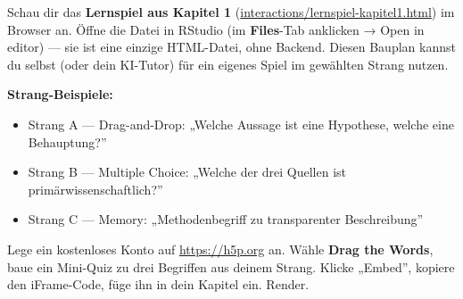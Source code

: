 \documentclass[
  ngerman,
  a4paper,
  DIV=11]{scrreprt}
\providecommand{\tightlist}{%
  \setlength{\itemsep}{0pt}\setlength{\parskip}{0pt}}
\begin{document}
\begin{tcolorbox}[enhanced jigsaw, opacitybacktitle=0.6, leftrule=.75mm, title=\textcolor{quarto-callout-tip-color}{\faLightbulb}\hspace{0.5em}{Mach mit (Variante A --- statisches HTML)}, colframe=quarto-callout-tip-color-frame, arc=.35mm, toprule=.15mm, colbacktitle=quarto-callout-tip-color!10!white, bottomrule=.15mm, colback=white, rightrule=.15mm, breakable, toptitle=1mm, bottomtitle=1mm, opacityback=0, titlerule=0mm, coltitle=black, left=2mm]

Schau dir das \textbf{Lernspiel aus Kapitel 1}
(\href{../interactions/lernspiel-kapitel1.html}{interactions/lernspiel-kapitel1.html})
im Browser an. Öffne die Datei in RStudio (im \textbf{Files}-Tab
anklicken → Open in editor) --- sie ist eine einzige HTML-Datei, ohne
Backend. Diesen Bauplan kannst du selbst (oder dein KI-Tutor) für ein
eigenes Spiel im gewählten Strang nutzen.

\textbf{Strang-Beispiele:}

\begin{itemize}
\tightlist
\item
  Strang A --- Drag-and-Drop: „Welche Aussage ist eine Hypothese, welche
  eine Behauptung?''
\item
  Strang B --- Multiple Choice: „Welche der drei Quellen ist
  primärwissenschaftlich?''
\item
  Strang C --- Memory: „Methodenbegriff zu transparenter Beschreibung''
\end{itemize}

\end{tcolorbox}

\begin{tcolorbox}[enhanced jigsaw, opacitybacktitle=0.6, leftrule=.75mm, title=\textcolor{quarto-callout-tip-color}{\faLightbulb}\hspace{0.5em}{Mach mit (Variante B --- H5P, optional)}, colframe=quarto-callout-tip-color-frame, arc=.35mm, toprule=.15mm, colbacktitle=quarto-callout-tip-color!10!white, bottomrule=.15mm, colback=white, rightrule=.15mm, breakable, toptitle=1mm, bottomtitle=1mm, opacityback=0, titlerule=0mm, coltitle=black, left=2mm]

Lege ein kostenloses Konto auf \url{https://h5p.org} an. Wähle
\textbf{Drag the Words}, baue ein Mini-Quiz zu drei Begriffen aus deinem
Strang. Klicke „Embed'', kopiere den iFrame-Code, füge ihn in dein
Kapitel ein. Render.

\end{tcolorbox}
\end{document}
